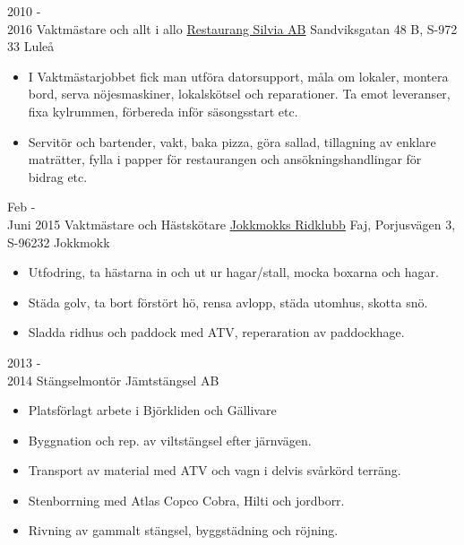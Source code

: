 \documentclass[a4paper]{twentysecondcv} %
\begin{document}

\newpage %
\makeprofile %

\begin{twenty}
    \twentyitem
   		{2010 - \\ 2016}
        {Vaktmästare och allt i allo}
        {\href{http://www.allabolag.se/5564685435/restaurang-silvia-aktiebolag}
        			{Restaurang Silvia AB}}
        {Sandviksgatan 48 B, S-972 33 Luleå }
        {
       {\begin{itemize}
	        \item I Vaktmästarjobbet fick man utföra datorsupport, måla om lokaler, montera
            bord, serva nöjesmaskiner, lokalskötsel och reparationer. Ta emot leveranser,
            fixa kylrummen, förbereda inför säsongsstart etc.
 	       \item Servitör och bartender, vakt, baka pizza, göra sallad, tillagning av
           enklare  maträtter, fylla i papper för restaurangen och ansökningshandlingar för
           bidrag etc.
 	   \end{itemize}}
        }
        
     \twentyitem
   		{Feb - \\ Juni 2015}
        {Vaktmästare och Hästskötare}
        {\href{http://idrottonline.se/JokkmokksRK-Ridsport/}{Jokkmokks Ridklubb}}
        {Faj, Porjusvägen 3, S-96232 Jokkmokk}
        {
        \begin{itemize}
        	\item Utfodring, ta hästarna in och ut ur hagar/stall, mocka boxarna och hagar.
  	  		\item Städa golv, ta bort förstört hö, rensa avlopp, städa utomhus, skotta snö.
    	    \item Sladda ridhus och paddock med ATV, reperaration av paddockhage.
    \end{itemize}
    	}
        
	\twentyitem
    	{2013 - \\ 2014}
        {Stängselmontör}
        {Jämtstängsel AB}
        {}
        {
        \begin{itemize}
        	\item Platsförlagt arbete i Björkliden och Gällivare
            \item Byggnation och rep. av viltstängsel efter järnvägen.
            \item Transport av material med ATV och vagn i delvis svårkörd terräng.
            \item Stenborrning med Atlas Copco Cobra, Hilti och jordborr.
            \item Rivning av gammalt stängsel, byggstädning och röjning.
        \end{itemize}
        }


\end{twenty}
\end{document}
